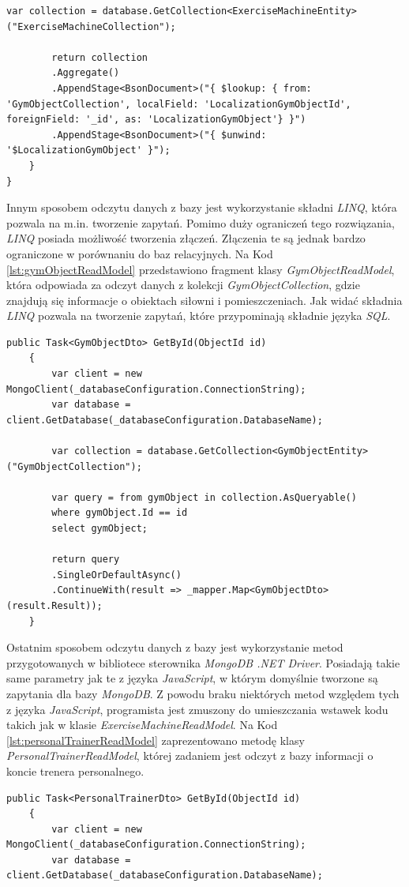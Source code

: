 \documentclass[a4paper,twoside,12pt]{book}
\begin{document}
{\begin{lstlisting}[caption={Metoda odczytu danych z kolekcji \textit{ExerciseMachineCollection} przy wykorzystaniu wstawek \textit{JavaScript}}, label={lst:exerciseMachineReadModel}]
		var collection = database.GetCollection<ExerciseMachineEntity>("ExerciseMachineCollection");
		
		return collection
		.Aggregate()
		.AppendStage<BsonDocument>("{ $lookup: { from: 'GymObjectCollection', localField: 'LocalizationGymObjectId', foreignField: '_id', as: 'LocalizationGymObject'} }")
		.AppendStage<BsonDocument>("{ $unwind: '$LocalizationGymObject' }");
	}
}
\end{lstlisting}
Innym sposobem odczytu danych z bazy jest wykorzystanie składni \textit{LINQ}, która pozwala na m.in. tworzenie zapytań. Pomimo duży ograniczeń tego rozwiązania, \textit{LINQ} posiada możliwość tworzenia złączeń. Złączenia te są jednak bardzo ograniczone w porównaniu do baz relacyjnych. Na Kod \ref{lst:gymObjectReadModel} przedstawiono fragment klasy \textit{GymObjectReadModel}, która odpowiada za odczyt danych z kolekcji \textit{GymObjectCollection}, gdzie znajdują się informacje o obiektach siłowni i pomieszczeniach. Jak widać składnia \textit{LINQ} pozwala na tworzenie zapytań, które przypominają składnie języka \textit{SQL}.
\begin{lstlisting}[caption={Metoda odczytu danych z kolekcji \textit{GymObjectCollection} przy wykorzystaniu wstawek składni \textit{LINQ}}, label={lst:gymObjectReadModel}]
	public Task<GymObjectDto> GetById(ObjectId id)
	{
		var client = new MongoClient(_databaseConfiguration.ConnectionString);
		var database = client.GetDatabase(_databaseConfiguration.DatabaseName);
		
		var collection = database.GetCollection<GymObjectEntity>("GymObjectCollection");
		
		var query = from gymObject in collection.AsQueryable()
		where gymObject.Id == id
		select gymObject;
		
		return query
		.SingleOrDefaultAsync()
		.ContinueWith(result => _mapper.Map<GymObjectDto>(result.Result));
	}
\end{lstlisting}

Ostatnim sposobem odczytu danych z bazy jest wykorzystanie metod przygotowanych w bibliotece sterownika \textit{MongoDB .NET Driver}. Posiadają takie same parametry jak te z języka \textit{JavaScript}, w którym domyślnie tworzone są zapytania dla bazy \textit{MongoDB}. Z powodu braku niektórych metod względem tych z języka \textit{JavaScript}, programista jest zmuszony do umieszczania wstawek kodu takich jak w klasie \textit{ExerciseMachineReadModel}. Na Kod \ref{lst:personalTrainerReadModel} zaprezentowano metodę klasy 
\textit{PersonalTrainerReadModel}, której zadaniem jest odczyt z bazy informacji o koncie trenera personalnego.
\begin{lstlisting}[caption={Metoda odczytu informacji o koncie trenera personalnego przy wykorzystaniu metod sterownika}, label={lst:personalTrainerReadModel}]
	public Task<PersonalTrainerDto> GetById(ObjectId id)
	{
		var client = new MongoClient(_databaseConfiguration.ConnectionString);
		var database = client.GetDatabase(_databaseConfiguration.DatabaseName);
		

\end{lstlisting}}
\end{document}
